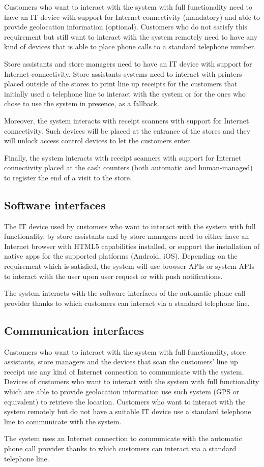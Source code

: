 \documentclass[../../main.tex]{subfiles}
\begin{document}
Customers who want to interact with the system with full functionality need to
have an IT device with support for Internet connectivity (mandatory) and able to
provide geolocation information (optional). Customers who do not satisfy this
requirement but still want to interact with the system remotely need to have any
kind of devices that is able to place phone calls to a standard telephone
number.

Store assistants and store managers need to have an IT device with support for
Internet connectivity. Store assistants systems need to interact with printers
placed outside of the stores to print line up receipts for the customers that
initially used a telephone line to interact with the system or for the ones who
chose to use the system in presence, as a fallback.

Moreover, the system interacts with receipt scanners with support for Internet
connectivity. Such devices will be placed at the entrance of the stores and they
will unlock access control devices to let the customers enter. 

Finally, the system interacts with receipt scanners with support for Internet
connectivity placed at the cash counters (both automatic and human-managed) to
register the end of a visit to the store.

\subsection{Software interfaces}

The IT device used by customers who want to interact with the system with full
functionality, by store assistants and by store managers need to either have an
Internet browser with HTML5 capabilities installed, or support the installation
of native apps for the supported platforms (Android, iOS). Depending on the
requirement which is satisfied, the system will use browser APIs or system APIs
to interact with the user upon user request or with push notifications.

The system interacts with the software interfaces of the automatic phone call
provider thanks to which customers can interact via a standard telephone line.

\subsection{Communication interfaces}

Customers who want to interact with the system with full functionality, store
assistants, store managers and the devices that scan the customers' line up
receipt use any kind of Internet connection to communicate with the system.
Devices of customers who want to interact with the system with full
functionality which are able to provide geolocation information use such system
(GPS or equivalent) to retrieve the location. Customers who want to interact
with the system remotely but do not have a suitable IT device use a standard
telephone line to communicate with the system.

The system uses an Internet connection to communicate with the automatic phone
call provider thanks to which customers can interact via a standard telephone
line.
\end{document}
